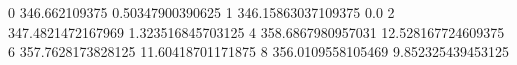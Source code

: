 0 346.662109375 0.50347900390625
1 346.15863037109375 0.0
2 347.4821472167969 1.323516845703125
4 358.6867980957031 12.528167724609375
6 357.7628173828125 11.60418701171875
8 356.0109558105469 9.852325439453125
